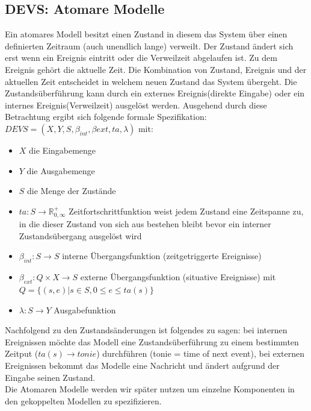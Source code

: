 \documentclass[11pt, fleqn, a4paper, leqno]{scrartcl} %
\begin{document}
	\subsection{DEVS: Atomare Modelle}
		Ein atomares Modell besitzt einen Zustand in diesem das System über einen definierten Zeitraum (auch unendlich lange) verweilt. Der Zustand ändert sich erst wenn ein Ereignis eintritt oder die Verweilzeit abgelaufen ist. Zu dem Ereignis gehört die aktuelle Zeit. Die Kombination von Zustand, Ereignis und der aktuellen Zeit entscheidet in welchem neuen Zustand das System übergeht. Die Zustandsüberführung kann durch ein externes Ereignis(direkte Eingabe) oder ein internes Ereignis(Verweilzeit) ausgelöst werden. Ausgehend durch diese Betrachtung ergibt sich folgende formale Spezifikation: $DEVS = (X,Y,S,\beta_{int},\beta{ext},ta,\lambda)$ mit: 
		\begin{itemize}
			\item $X$ die Eingabemenge
			\item $Y$ die Ausgabemenge
			\item $S$ die Menge der Zustände
			\item $ta: S \rightarrow \mathds{R}^{+}_{0,\infty}$ Zeitfortschrittfunktion weist jedem Zustand eine Zeitspanne zu, in die dieser Zustand von sich aus bestehen bleibt bevor ein interner Zustandsübergang ausgelöst wird
			\item $\beta_{int}: S \rightarrow S$ interne Übergangsfunktion (zeitgetriggerte Ereignisse)
			\item $\beta_{ext}: Q \times X \rightarrow S$ externe Übergangsfunktion (situative Ereignisse) mit $Q=\{(s,e)|s\in S, 0 \leq e \leq ta(s)\}$
			\item $\lambda: S \rightarrow Y$ Ausgabefunktion
		\end{itemize}
		Nachfolgend zu den Zustandsänderungen ist folgendes zu sagen: bei internen Ereignissen möchte das Modell eine Zustandsüberführung zu einem bestimmten Zeitput ($ta(s) \rightarrow tonie$) durchführen (tonie = time of next event), bei externen Ereignissen bekommt das Modelle eine Nachricht und ändert aufgrund der Eingabe seinen Zustand.\\
		Die Atomaren Modelle werden wir später nutzen um einzelne Komponenten in den gekoppelten Modellen zu spezifizieren.
\end{document}
